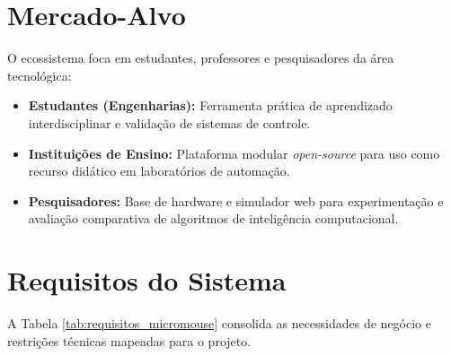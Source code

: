 \section{Mercado-Alvo}
O ecossistema foca em estudantes, professores e pesquisadores da área tecnológica:
\begin{itemize}
    \item \textbf{Estudantes (Engenharias):} Ferramenta prática de aprendizado interdisciplinar e validação de sistemas de controle.
    \item \textbf{Instituições de Ensino:} Plataforma modular \textit{open-source} para uso como recurso didático em laboratórios de automação.
    \item \textbf{Pesquisadores:} Base de hardware e simulador web para experimentação e avaliação comparativa de algoritmos de inteligência computacional.
\end{itemize}

\section{Requisitos do Sistema}
A Tabela \ref{tab:requisitos_micromouse} consolida as necessidades de negócio e restrições técnicas mapeadas para o projeto.

